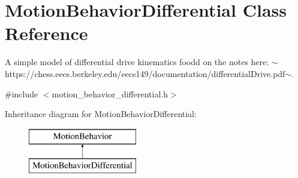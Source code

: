 \hypertarget{class_motion_behavior_differential}{}\section{Motion\+Behavior\+Differential Class Reference}
\label{class_motion_behavior_differential}


A simple model of differential drive kinematics foodd on the notes here\+: $\sim$https\+://chess.eecs.\+berkeley.\+edu/eecs149/documentation/differential\+Drive.pdf$\sim$.  




{\ttfamily \#include $<$motion\+\_\+behavior\+\_\+differential.\+h$>$}

Inheritance diagram for Motion\+Behavior\+Differential\+:\begin{figure}[H]
\begin{center}
\leavevmode
\includegraphics[height=2.000000cm]{class_motion_behavior_differential}
\end{center}
\end{figure}
